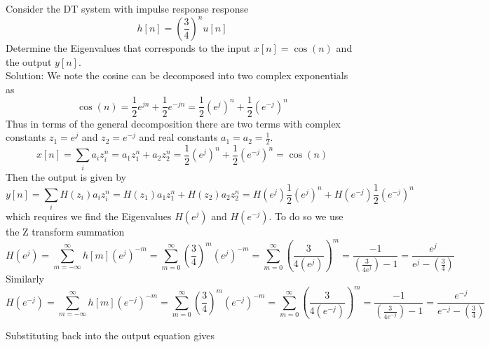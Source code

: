 \begin{example} Consider the DT system with impulse response response
  \[
  h[n] = \left(\frac{3}{4}\right)^{n}u[n]
  \]
  Determine the Eigenvalues that corresponds to the input $x[n] = \cos(n)$ and the output $y[n]$.\\

  Solution: We note the cosine can be decomposed into two complex exponentials as
  \[
  \cos(n) = \frac{1}{2}e^{jn} + \frac{1}{2}e^{-jn} = \frac{1}{2}\left(e^{j}\right)^n + \frac{1}{2}\left(e^{-j}\right)^n
  \]
  Thus in terms of the general decomposition there are two terms with complex constants $z_1 = e^{j}$ and $z_2 = e^{-j}$ and real constants $a_1 = a_2 = \frac{1}{2}$.
  \[
   x[n] = \sum_i a_i z_i^{n} = a_1 z_1^{n} + a_2 z_2^{n} = \frac{1}{2}\left(e^{j}\right)^n + \frac{1}{2}\left(e^{-j}\right)^n = \cos(n)
   \]
   Then the output is given by
   \[
   y[n] = \sum_i H(z_i) a_i z_i^{n} = H(z_1) a_1 z_1^{n} + H(z_2) a_2 z_2^{n} = H\left(e^{j}\right)\frac{1}{2}\left(e^{j}\right)^n + H\left(e^{-j}\right)\frac{1}{2}\left(e^{-j}\right)^n 
   \]
   which requires we find the Eigenvalues $H\left(e^{j}\right)$ and $H\left(e^{-j}\right)$. To do so we use the Z transform summation
   \[
   H\left(e^{j}\right) = \sum\limits_{m = -\infty}^{\infty}h[m]\left(e^{j}\right)^{-m} = \sum\limits_{m = 0}^{\infty} \left(\frac{3}{4}\right)^{m}\left(e^{j}\right)^{-m} = \sum\limits_{m =0}^{\infty} \left(\frac{3}{4\left(e^{j}\right)}\right)^{m} = \frac{-1}{\left(\frac{3}{4e^{j}}\right)-1} = \frac{e^{j}}{e^{j}-\left(\frac{3}{4}\right)}
   \]
   Similarly
   \[
   H\left(e^{-j}\right) = \sum\limits_{m = -\infty}^{\infty}h[m]\left(e^{-j}\right)^{-m} = \sum\limits_{m = 0}^{\infty} \left(\frac{3}{4}\right)^{m}\left(e^{-j}\right)^{-m} = \sum\limits_{m =0}^{\infty} \left(\frac{3}{4\left(e^{-j}\right)}\right)^{m} = \frac{-1}{\left(\frac{3}{4e^{-j}}\right)-1} = \frac{e^{-j}}{e^{-j}-\left(\frac{3}{4}\right)}
   \]

   Substituting back into the output equation gives
   

\end{example}
